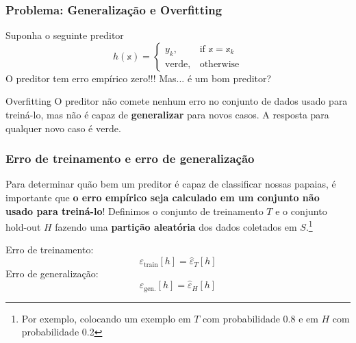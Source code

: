 \begin{frame}
    \frametitle{Problema: Generalização e Overfitting}
    \begin{block}{Suponha o seguinte preditor}
        $$
        h(\mathbb{x}) = \begin{cases}
            y_k,              & \text{if } \mathbb{x} = \mathbb{x}_k\\
            \mathrm{verde},   & \text{otherwise}
        \end{cases}
        $$
    O preditor tem erro empírico zero!!! Mas... é um bom preditor?
    \end{block}
    \begin{block}{Overfitting}
        O preditor não comete nenhum erro no conjunto de dados usado para treiná-lo, mas não é capaz de \textbf{generalizar} para novos casos. A resposta para qualquer novo caso é $\mathrm{verde}$.
    \end{block}
\end{frame}


\begin{frame}
    \frametitle{Erro de treinamento e erro de generalização}
    \begin{block}{}
    Para determinar quão bem um preditor é capaz de classificar nossas papaias, é importante que \textbf{o erro empírico seja calculado em um conjunto não usado para treiná-lo}!
    Definimos o conjunto de treinamento $T$ e o conjunto hold-out $H$ fazendo uma \textbf{partição aleatória} dos dados coletados em $S$.\footnote{Por exemplo, colocando um exemplo em $T$ com probabilidade 0.8 e em $H$ com probabilidade 0.2}

    Erro de treinamento:
    $$ \varepsilon_{\text{train}}[h] = \hat\varepsilon_T[h]  $$
    Erro de generalização:
    $$ \varepsilon_{\text{gen.}}[h] = \hat\varepsilon_H[h]  $$
    \end{block}
\end{frame}

